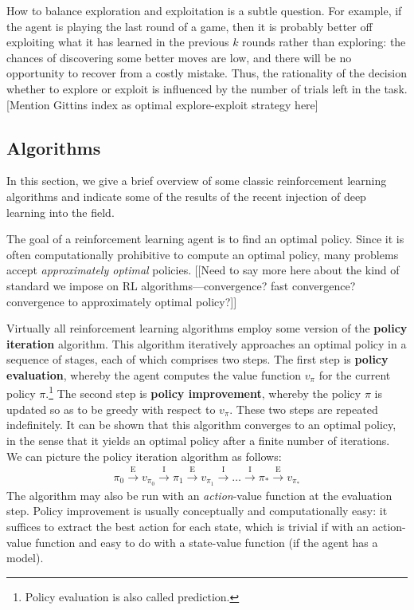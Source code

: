 \documentclass{my-tufte}
\begin{document}
How to balance exploration and exploitation is a subtle question.
For example, if the agent is playing the last round of a game, then it is probably better off exploiting what it has learned in the previous $k$ rounds rather than exploring: the chances of discovering some better moves are low, and 
there will be no opportunity to recover from a costly mistake.
Thus, the rationality of the decision whether to explore or exploit is influenced by the number of trials left in the task.
[Mention Gittins index as optimal explore-exploit strategy here]



\subsection{Algorithms}

In this section, we give a brief overview of some classic reinforcement learning algorithms and indicate some of the results of the recent injection of deep learning into the field.

The goal of a reinforcement learning agent is to find an optimal policy.
Since it is often computationally prohibitive to compute an optimal policy, many problems accept \emph{approximately optimal} policies.
[[Need to say more here about the kind of standard we impose on RL algorithms---convergence? fast convergence? convergence to approximately optimal policy?]]

Virtually all reinforcement learning algorithms employ some version of the \textbf{policy iteration} algorithm.
This algorithm iteratively approaches an optimal policy in a sequence of stages, each of which comprises two steps.
The first step is \textbf{policy evaluation}, whereby the agent computes the value function $v_\pi$ for the current policy $\pi$.\footnote{Policy evaluation is also called prediction.}
The second step is \textbf{policy improvement}, whereby the policy $\pi$ is updated so as to be greedy with respect to $v_\pi$.
These two steps are repeated indefinitely.
It can be shown that this algorithm converges to an optimal policy, in the sense that it yields an optimal policy after a finite number of iterations.
We can picture the policy iteration algorithm as follows:
\begin{align*}
	\pi_0 \overset{\text{E}}\longrightarrow v_{\pi_0} \overset{\text{I}}\longrightarrow \pi_1 \overset{\text{E}}\longrightarrow v_{\pi_1} \overset{\text{I}}\longrightarrow \dots \overset{\text{I}}\longrightarrow \pi_*\overset{\text{E}}\longrightarrow v_{\pi_*}
\end{align*}
The algorithm may also be run with an \emph{action}-value function at the evaluation step.
Policy improvement is usually conceptually and computationally easy: it suffices to extract the best action for each state, which is trivial if with an action-value function and easy to do with a state-value function (if the agent has a model).
\end{document}
